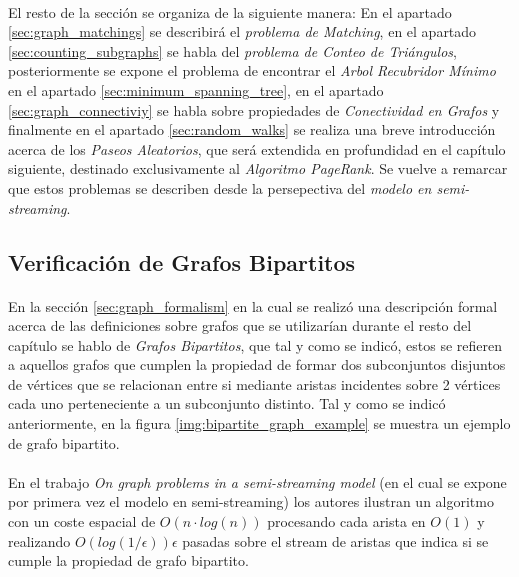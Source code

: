 \documentclass{subfiles}
\begin{document}
      \paragraph{}
      El resto de la sección se organiza de la siguiente manera: En el apartado \ref{sec:graph_matchings} se describirá el \emph{problema de Matching}, en el apartado \ref{sec:counting_subgraphs} se habla del \emph{problema de Conteo de Triángulos}, posteriormente se expone el problema de encontrar el \emph{Arbol Recubridor Mínimo} en el apartado \ref{sec:minimum_spanning_tree}, en el apartado \ref{sec:graph_connectiviy} se habla sobre propiedades de \emph{Conectividad en Grafos} y finalmente en el apartado \ref{sec:random_walks} se realiza una breve introducción acerca de los \emph{Paseos Aleatorios}, que será extendida en profundidad en el capítulo siguiente, destinado exclusivamente al \emph{Algoritmo PageRank}. Se vuelve a remarcar que estos problemas se describen desde la persepectiva del \emph{modelo en semi-streaming}.

      \subsection{Verificación de Grafos Bipartitos}
      \label{sec:bipartite_matchings}

        \paragraph{}
        En la sección \ref{sec:graph_formalism} en la cual se realizó una descripción formal acerca de las definiciones sobre grafos que se utilizarían durante el resto del capítulo se hablo de \emph{Grafos Bipartitos}, que tal y como se indicó, estos se refieren a aquellos grafos que cumplen la propiedad de formar dos subconjuntos disjuntos de vértices que se relacionan entre si mediante aristas incidentes sobre 2 vértices cada uno perteneciente a un subconjunto distinto. Tal y como se indicó anteriormente, en la figura \ref{img:bipartite_graph_example} se muestra un ejemplo de grafo bipartito.

        \paragraph{}
        En el trabajo \emph{On graph problems in a semi-streaming model}\cite{feigenbaum2005graph} (en el cual se expone por primera vez el modelo en semi-streaming) los autores ilustran un algoritmo con un coste espacial de $O(n \cdot log(n))$ procesando cada arista en $O(1)$ y realizando $O(log(1 / \epsilon)) \epsilon$ pasadas sobre el stream de aristas que indica si se cumple la propiedad de grafo bipartito.
\end{document}

